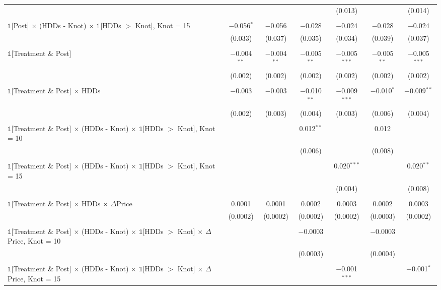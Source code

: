 \begin{table}[!htbp]
\begin{tabular}{@{\extracolsep{20pt}}lcccccc}
  &  &  &  & (0.013) &  & (0.014) \\ 
  & & & & & & \\ 
 $\mathbb{1}$[Post] $\times$ (HDDs - Knot) $\times$ $\mathbb{1}$[HDDs $>$ Knot],  Knot = 15 & $-$0.056$^{*}$ & $-$0.056 & $-$0.028 & $-$0.024 & $-$0.028 & $-$0.024 \\ 
  & (0.033) & (0.037) & (0.035) & (0.034) & (0.039) & (0.037) \\ 
  & & & & & & \\ 
 $\mathbb{1}$[Treatment \& Post] & $-$0.004$^{**}$ & $-$0.004$^{**}$ & $-$0.005$^{**}$ & $-$0.005$^{***}$ & $-$0.005$^{**}$ & $-$0.005$^{***}$ \\ 
  & (0.002) & (0.002) & (0.002) & (0.002) & (0.002) & (0.002) \\ 
  & & & & & & \\ 
 $\mathbb{1}$[Treatment \& Post] $\times$ HDDs & $-$0.003 & $-$0.003 & $-$0.010$^{**}$ & $-$0.009$^{***}$ & $-$0.010$^{*}$ & $-$0.009$^{**}$ \\ 
  & (0.002) & (0.003) & (0.004) & (0.003) & (0.006) & (0.004) \\ 
  & & & & & & \\ 
 $\mathbb{1}$[Treatment \& Post] $\times$ (HDDs - Knot) $\times$ $\mathbb{1}$[HDDs $>$ Knot],  Knot = 10 &  &  & 0.012$^{**}$ &  & 0.012 &  \\ 
  &  &  & (0.006) &  & (0.008) &  \\ 
  & & & & & & \\ 
 $\mathbb{1}$[Treatment \& Post] $\times$ (HDDs - Knot) $\times$ $\mathbb{1}$[HDDs $>$ Knot],  Knot = 15 &  &  &  & 0.020$^{***}$ &  & 0.020$^{**}$ \\ 
  &  &  &  & (0.004) &  & (0.008) \\ 
  & & & & & & \\ 
 $\mathbb{1}$[Treatment \& Post] $\times$ HDDs $\times$ $\Delta$Price & 0.0001 & 0.0001 & 0.0002 & 0.0003 & 0.0002 & 0.0003 \\ 
  & (0.0002) & (0.0002) & (0.0002) & (0.0002) & (0.0003) & (0.0002) \\ 
  & & & & & & \\ 
 $\mathbb{1}$[Treatment \& Post] $\times$ (HDDs - Knot) $\times$ $\mathbb{1}$[HDDs $>$ Knot] $\times$ $\Delta$Price,  Knot = 10 &  &  & $-$0.0003 &  & $-$0.0003 &  \\ 
  &  &  & (0.0003) &  & (0.0004) &  \\ 
  & & & & & & \\ 
 $\mathbb{1}$[Treatment \& Post] $\times$ (HDDs - Knot) $\times$ $\mathbb{1}$[HDDs $>$ Knot] $\times$ $\Delta$Price,  Knot = 15 &  &  &  & $-$0.001$^{***}$ &  & $-$0.001$^{*}$ \\ 

\end{tabular}
\end{table}
